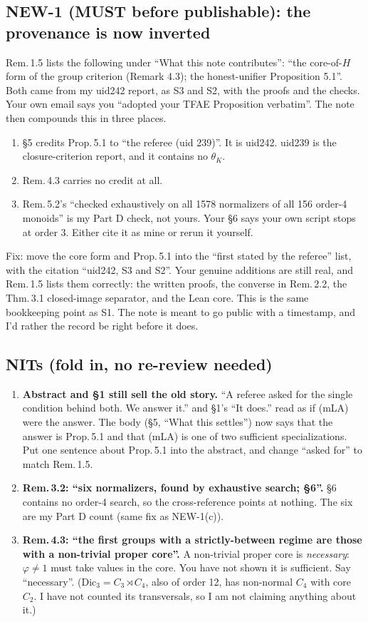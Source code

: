 \documentclass[11pt]{article}
\begin{document}
\subsection*{NEW-1 (MUST before publishable): the provenance is now inverted}
Rem.\,1.5 lists the following under ``What this note contributes'': ``the core-of-$H$ form of the group criterion
(Remark 4.3); the honest-unifier Proposition 5.1''. Both came from my uid242 report, as S3 and S2, with the
proofs and the checks. Your own email says you ``adopted your TFAE Proposition verbatim''. The note then
compounds this in three places.
\begin{enumerate}[label=(\alph*),leftmargin=*]
\item \S5 credits Prop.\,5.1 to ``the referee (uid 239)''. It is uid242. uid239 is the closure-criterion report,
  and it contains no $\theta_K$.
\item Rem.\,4.3 carries no credit at all.
\item Rem.\,5.2's ``checked exhaustively on all 1578 normalizers of all 156 order-4 monoids'' is my Part D check,
  not yours. Your \S6 says your own script stops at order 3. Either cite it as mine or rerun it yourself.
\end{enumerate}
Fix: move the core form and Prop.\,5.1 into the ``first stated by the referee'' list, with the citation ``uid242,
S3 and S2''. Your genuine additions are still real, and Rem.\,1.5 lists them correctly: the written proofs, the converse in
Rem.\,2.2, the Thm.\,3.1 closed-image separator, and the Lean core. This is the same bookkeeping point as S1. The note is
meant to go public with a timestamp, and I'd rather the record be right before it does.

\subsection*{NITs (fold in, no re-review needed)}
\begin{enumerate}[label=\textbf{N-\alph*.},leftmargin=*]
\item \textbf{Abstract and \S1 still sell the old story.} ``A referee asked for the single condition behind both. We
  answer it.'' and \S1's ``It does.'' read as if (mLA) were the answer. The body (\S5, ``What this settles'') now says
  that the answer is Prop.\,5.1 and that (mLA) is one of two sufficient specializations. Put one sentence about Prop.\,5.1 into the
  abstract, and change ``asked for'' to match Rem.\,1.5.
\item \textbf{Rem.\,3.2: ``six normalizers, found by exhaustive search; \S6''.} \S6 contains no order-4 search, so
  the cross-reference points at nothing. The six are my Part D count (same fix as NEW-1(c)).
\item \textbf{Rem.\,4.3: ``the first groups with a strictly-between regime are those with a non-trivial proper
  core''.} A non-trivial proper core is \emph{necessary}: $\varphi\neq1$ must take values in the core. You have not shown it
  is sufficient. Say ``necessary''. ($\mathrm{Dic}_3=C_3\rtimes C_4$, also of order 12, has non-normal $C_4$ with core $C_2$.
  I have not counted its transversals, so I am not claiming anything about it.)
\end{enumerate}
\end{document}

